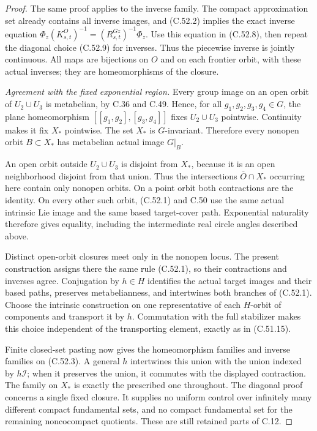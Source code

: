 \begin{proof}
The same proof applies to the inverse family.
The compact approximation set already contains
all inverse images, and (C.52.2) implies the
exact inverse equation
$\Phi_z(K^O_{s,t})^{-1}=(R^{Gz}_{s,t})^{-1}\Phi_z$.
Use this equation in (C.52.8), then repeat the
diagonal choice (C.52.9) for inverses.
Thus the piecewise inverse is jointly continuous.
All maps are bijections on $O$ and on each
frontier orbit, with these actual inverses;
they are homeomorphisms of the closure.

\emph{Agreement with the fixed exponential region.}
Every group image on an open orbit of $U_2\cup U_3$
is metabelian, by C.36 and C.49. Hence, for all
$g_1,g_2,g_3,g_4\in G$, the plane homeomorphism
$[[g_1,g_2],[g_3,g_4]]$ fixes $U_2\cup U_3$
pointwise. Continuity makes it fix $X_*$ pointwise.
The set $X_*$ is $G$-invariant. Therefore every
nonopen orbit $B\subset X_*$ has metabelian
actual image $G|_B$.

An open orbit outside $U_2\cup U_3$ is disjoint
from $X_*$, because it is an open neighborhood
disjoint from that union. Thus the intersections
$\overline O\cap X_*$ occurring here contain only
nonopen orbits. On a point orbit both
contractions are the identity. On every other
such orbit, (C.52.1) and C.50 use the same
actual intrinsic Lie image and the same
based target-cover path. Exponential naturality
therefore gives equality, including the
intermediate real circle angles described above.

Distinct open-orbit closures meet only in the
nonopen locus. The present construction assigns
there the same rule (C.52.1), so their contractions
and inverses agree. Conjugation by $h\in H$
identifies the actual target images and their
based paths, preserves metabelianness, and
intertwines both branches of (C.52.1).
Choose the intrinsic construction on one
representative of each $H$-orbit of components
and transport it by $h$. Commutation with the
full stabilizer makes this choice independent
of the transporting element, exactly as in
(C.51.15).

Finite closed-set pasting now gives the
homeomorphism families and inverse families
on (C.52.3). A general $h$ intertwines this
union with the union indexed by $h\mathcal I$;
when it preserves the union, it commutes with
the displayed contraction. The family on
$X_*$ is exactly the prescribed one throughout.
The diagonal proof concerns a single fixed
closure. It supplies no uniform control over
infinitely many different compact fundamental
sets, and no compact fundamental set for the
remaining noncocompact quotients. These are
still retained parts of C.12.
\end{proof}
